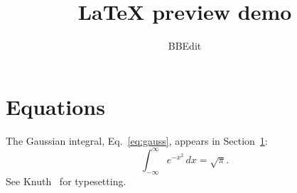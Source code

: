 \documentclass{article}
\title{LaTeX preview demo}
\author{BBEdit}
\begin{document}
\maketitle
\ifdefined\bbeditpreview
  \begin{center}\end{center}
\fi

\section{Equations}\label{sec:eq}
The Gaussian integral, Eq.~\eqref{eq:gauss}, appears in Section~\ref{sec:eq}:
\begin{equation}
  \int_{-\infty}^{\infty} e^{-x^2}\,dx = \sqrt{\pi}. \label{eq:gauss}
\end{equation}
See Knuth~\cite{knuth84} for typesetting.





\end{document}
